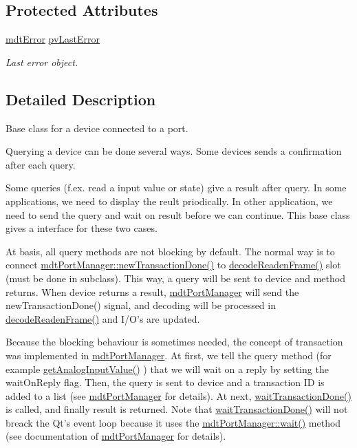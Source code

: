 \subsection*{Protected Attributes}
\begin{DoxyCompactItemize}
\item 
\hyperlink{classmdt_error}{mdt\-Error} \hyperlink{classmdt_device_ab54221195bbf9363f7e7f10ef38a3909}{pv\-Last\-Error}
\begin{DoxyCompactList}\small\item\em Last error object. \end{DoxyCompactList}\end{DoxyCompactItemize}


\subsection{Detailed Description}
Base class for a device connected to a port. 

Querying a device can be done several ways. Some devices sends a confirmation after each query.

Some queries (f.\-ex. read a input value or state) give a result after query. In some applications, we need to display the reult priodically. In other application, we need to send the query and wait on result before we can continue. This base class gives a interface for these two cases.

At basis, all query methods are not blocking by default. The normal way is to connect \hyperlink{classmdt_port_manager_a416a24db1048e9f66aef27ea810954d2}{mdt\-Port\-Manager\-::new\-Transaction\-Done()} to \hyperlink{classmdt_device_ad211ba3be781c3db0397d5bf91f796d1}{decode\-Readen\-Frame()} slot (must be done in subclass). This way, a query will be sent to device and method returns. When device returns a result, \hyperlink{classmdt_port_manager}{mdt\-Port\-Manager} will send the new\-Transaction\-Done() signal, and decoding will be processed in \hyperlink{classmdt_device_ad211ba3be781c3db0397d5bf91f796d1}{decode\-Readen\-Frame()} and I/\-O's are updated.

Because the blocking behaviour is sometimes needed, the concept of transaction was implemented in \hyperlink{classmdt_port_manager}{mdt\-Port\-Manager}. At first, we tell the query method (for example \hyperlink{classmdt_device_ab828764660ba53ffce1995901ddf5a0a}{get\-Analog\-Input\-Value()} ) that we will wait on a reply by setting the wait\-On\-Reply flag. Then, the query is sent to device and a transaction I\-D is added to a list (see \hyperlink{classmdt_port_manager}{mdt\-Port\-Manager} for details). At next, \hyperlink{classmdt_device_ab937015c1a319b7234442a4cc29a02a8}{wait\-Transaction\-Done()} is called, and finally result is returned. Note that \hyperlink{classmdt_device_ab937015c1a319b7234442a4cc29a02a8}{wait\-Transaction\-Done()} will not breack the Qt's event loop because it uses the \hyperlink{classmdt_port_manager_aaa85e0200aba0e0f4392dfe01abae2cf}{mdt\-Port\-Manager\-::wait()} method (see documentation of \hyperlink{classmdt_port_manager}{mdt\-Port\-Manager} for details).

